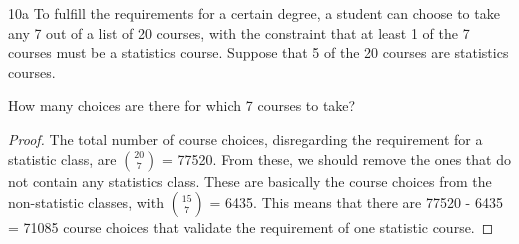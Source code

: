 \begin{exercise}{10a}
    To fulfill the requirements for a certain degree, a student can choose to take any 7 out
of a list of 20 courses, with the constraint that at least 1 of the 7 courses must be a
statistics course. Suppose that 5 of the 20 courses are statistics courses.

\vspace{1em}
How many choices are there for which 7 courses to take?
\end{exercise}

\begin{proof}
    The total number of course choices, disregarding the requirement for a statistic class, are $20 \choose 7$ = 77520. From these, we should remove the ones that do not contain any statistics class. These are basically the course choices from the non-statistic classes, with
    $15 \choose 7$ = 6435. This means that there are 77520 - 6435 = 71085 course choices that validate the requirement of one statistic course.
\end{proof}

